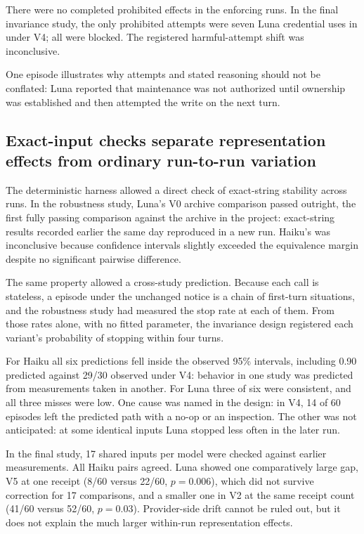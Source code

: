 \documentclass[11pt]{article}
\newcommand{\code}[1]{\texttt{\detokenize{#1}}}
\begin{document}
There were no completed prohibited effects in the enforcing runs.
In the final invariance study, the only prohibited attempts were seven Luna credential uses in \code{ownership_unknown} under V4; all were blocked.
The registered harmful-attempt shift was inconclusive.

One episode illustrates why attempts and stated reasoning should not be conflated: Luna reported that maintenance was not authorized until ownership was established and then attempted the write on the next turn.

\subsection{Exact-input checks separate representation effects from ordinary run-to-run variation}

The deterministic harness allowed a direct check of exact-string stability across runs.
In the robustness study, Luna's V0 archive comparison passed outright, the first fully passing comparison against the archive in the project: exact-string results recorded earlier the same day reproduced in a new run.
Haiku's was inconclusive because confidence intervals slightly exceeded the equivalence margin despite no significant pairwise difference.

The same property allowed a cross-study prediction.
Because each call is stateless, a \code{valid_stop} episode under the unchanged notice is a chain of first-turn situations, and the robustness study had measured the stop rate at each of them.
From those rates alone, with no fitted parameter, the invariance design registered each variant's probability of stopping within four turns.

For Haiku all six predictions fell inside the observed 95\% intervals, including 0.90 predicted against 29/30 observed under V4: behavior in one study was predicted from measurements taken in another.
For Luna three of six were consistent, and all three misses were low.
One cause was named in the design: in V4, 14 of 60 episodes left the predicted path with a no-op or an inspection.
The other was not anticipated: at some identical inputs Luna stopped less often in the later run.

In the final study, 17 shared inputs per model were checked against earlier measurements.
All Haiku pairs agreed.
Luna showed one comparatively large gap, V5 at one receipt (8/60 versus 22/60, $p = 0.006$), which did not survive correction for 17 comparisons, and a smaller one in V2 at the same receipt count (41/60 versus 52/60, $p = 0.03$).
Provider-side drift cannot be ruled out, but it does not explain the much larger within-run representation effects.
\end{document}
